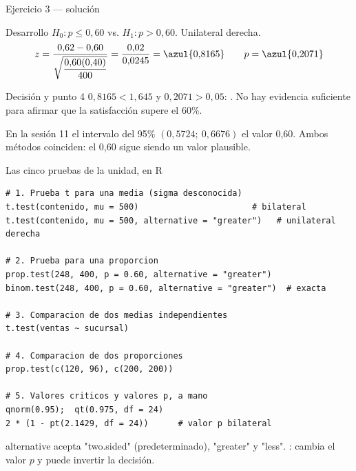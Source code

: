 \documentclass[aspectratio=169,10pt]{beamer}
\newcommand{\fx}[1]{{\ttfamily\color{uniAzul}#1}}
\begin{document}
\begin{frame}{Ejercicio 3 — solución}
  \small
  \begin{block}{Desarrollo}
    \footnotesize
    $H_0:p\le 0{,}60$ \; vs. \; $H_1:p>0{,}60$. Unilateral derecha.
    \[ z=\frac{0{,}62-0{,}60}{\sqrt{\dfrac{0{,}60(0{,}40)}{400}}}
        =\frac{0{,}02}{0{,}0245}=\azul{0{,}8165}
       \qquad p=\azul{0{,}2071} \]
  \end{block}

  \vspace{0.1cm}
  \begin{alertblock}{Decisión y punto 4}
    \footnotesize
    $0{,}8165<1{,}645$ y $0{,}2071>0{,}05$: . No
    hay evidencia suficiente para afirmar que la satisfacción supere el 60\%.

    \vspace{0.15cm}
    En la sesión 11 el intervalo del 95\% $(0{,}5724;\ 0{,}6676)$
     el valor 0{,}60. Ambos métodos coinciden: el 0{,}60 sigue
    siendo un valor plausible.
  \end{alertblock}
\end{frame}


\begin{frame}[fragile]{Las cinco pruebas de la unidad, en R}
  \scriptsize
\begin{lstlisting}[style=Rmini]
# 1. Prueba t para una media (sigma desconocida)
t.test(contenido, mu = 500)                       # bilateral
t.test(contenido, mu = 500, alternative = "greater")   # unilateral derecha

# 2. Prueba para una proporcion
prop.test(248, 400, p = 0.60, alternative = "greater")
binom.test(248, 400, p = 0.60, alternative = "greater")  # exacta

# 3. Comparacion de dos medias independientes
t.test(ventas ~ sucursal)

# 4. Comparacion de dos proporciones
prop.test(c(120, 96), c(200, 200))

# 5. Valores criticos y valores p, a mano
qnorm(0.95);  qt(0.975, df = 24)
2 * (1 - pt(2.1429, df = 24))      # valor p bilateral
\end{lstlisting}

  \vspace{-0.12cm}
  {\tiny\color{uniGris} \fx{alternative} acepta \fx{"two.sided"} (predeterminado),
  \fx{"greater"} y \fx{"less"}. :
  cambia el valor $p$ y puede invertir la decisión.}
\end{frame}
\end{document}
